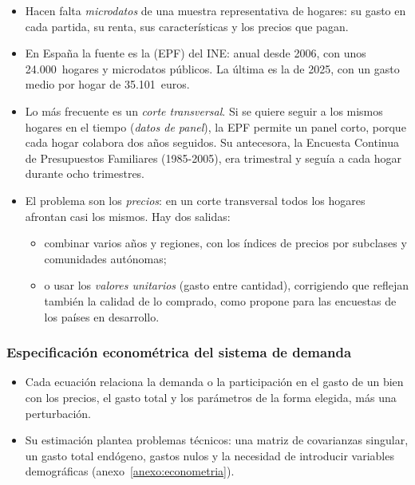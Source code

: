 \documentclass[11pt]{article}
\begin{document}
\begin{itemize}
\item Hacen falta \emph{microdatos} de una muestra representativa de hogares: su gasto en cada partida, su renta, sus características y los precios que pagan.
\item En España la fuente es la  (EPF) del INE: anual desde 2006, con unos 24.000~hogares y microdatos públicos. La última es la de 2025, con un gasto medio por hogar de 35.101~euros\nocite{INE2026EPF,INE2008EPFCaracteristicas}.
\item Lo más frecuente es un \emph{corte transversal}. Si se quiere seguir a los mismos hogares en el tiempo (\emph{datos de panel}), la EPF permite un panel corto, porque cada hogar colabora dos años seguidos. Su antecesora, la Encuesta Continua de Presupuestos Familiares (1985-2005), era trimestral y seguía a cada hogar durante ocho trimestres\nocite{INEEPFMetodologia,INE2008EPFCaracteristicas}.
\item El problema son los \emph{precios}: en un corte transversal todos los hogares afrontan casi los mismos. Hay dos salidas:
  \begin{itemize}
  \item combinar varios años y regiones, con los índices de precios por subclases y comunidades autónomas;
  \item o usar los \emph{valores unitarios} (gasto entre cantidad), corrigiendo que reflejan también la calidad de lo comprado, como propone \textcite{Deaton1997Analysis} para las encuestas de los países en desarrollo.
  \end{itemize}
\end{itemize}

\subsubsection{Especificación econométrica del sistema de demanda}\label{sec:especificacion-econometrica-sistema}

\begin{itemize}
\item Cada ecuación relaciona la demanda o la participación en el gasto de un bien con los precios, el gasto total y los parámetros de la forma elegida, más una perturbación.
\item Su estimación plantea problemas técnicos: una matriz de covarianzas singular, un gasto total endógeno, gastos nulos y la necesidad de introducir variables demográficas (anexo~\ref{anexo:econometria}).
\end{itemize}
\end{document}
